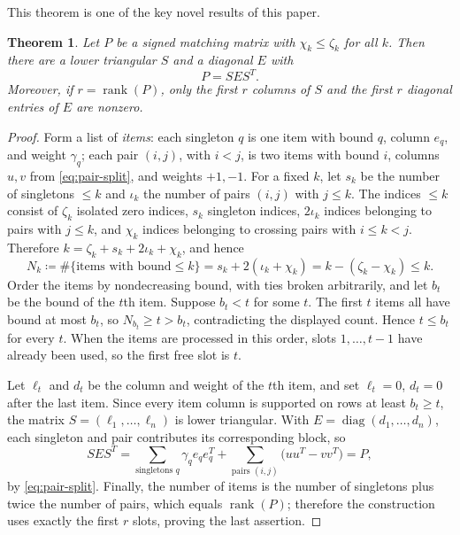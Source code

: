 \documentclass[preprint,12pt]{elsarticle}
\theoremstyle{plain}
\newtheorem{theorem}{Theorem}
\theoremstyle{nonumberplain}
\newtheorem{proof}{Proof}
\numberwithin{equation}{section}
\DeclareMathOperator{\rk}{rank}
\numberwithin{theorem}{section}
\begin{document}
This theorem is one of the key novel results of this paper.

\begin{theorem}\label{thm:ldlt-matching}
  Let $P$ be a signed matching matrix with $\chi_k \le \zeta_k$ for all $k$. Then there are a lower triangular $S$ and a diagonal $E$ with
  \[
    P = S E S^T .
  \]
  Moreover, if $r=\rk(P)$, only the first $r$ columns of $S$ and the first $r$ diagonal entries of $E$ are nonzero.
\end{theorem}

\begin{proof}
  Form a list of \emph{items}: each singleton $q$ is one item with bound $q$, column $e_q$, and weight $\gamma_q$; each pair $(i,j)$, with $i<j$, is two items with bound $i$, columns $u,v$ from \cref{eq:pair-split}, and weights $+1,-1$. For a fixed $k$, let $s_k$ be the number of singletons $\le k$ and $\iota_k$ the number of pairs $(i,j)$ with $j\le k$. The indices $\le k$ consist of $\zeta_k$ isolated zero indices, $s_k$ singleton indices, $2\iota_k$ indices belonging to pairs with $j\le k$, and $\chi_k$ indices belonging to crossing pairs with $i\le k<j$. Therefore $k=\zeta_k+s_k+2\iota_k+\chi_k$, and hence
  \[
    N_k\coloneq\#\{\text{items with bound}\le k\}
    = s_k + 2(\iota_k + \chi_k)
    = k - (\zeta_k - \chi_k)
    \le k .
  \]
  Order the items by nondecreasing bound, with ties broken arbitrarily, and let $b_t$ be the bound of the $t$th item. Suppose $b_t<t$ for some $t$. The first $t$ items all have bound at most $b_t$, so $N_{b_t}\ge t>b_t$, contradicting the displayed count. Hence $t\le b_t$ for every $t$. When the items are processed in this order, slots $1,\ldots,t-1$ have already been used, so the first free slot is $t$.

  Let $\ell_t$ and $d_t$ be the column and weight of the $t$th item, and set $\ell_t=0$, $d_t=0$ after the last item. Since every item column is supported on rows at least $b_t\ge t$, the matrix $S=(\ell_1,\ldots,\ell_n)$ is lower triangular. With $E=\operatorname{diag}(d_1,\ldots,d_n)$, each singleton and pair contributes its corresponding block, so
  \[
    S E S^T
    = \sum_{\text{singletons } q} \gamma_q e_q e_q^T
    + \sum_{\text{pairs } (i,j)} \bigl(uu^T-vv^T\bigr)
    = P ,
  \]
  by \cref{eq:pair-split}. Finally, the number of items is the number of singletons plus twice the number of pairs, which equals $\rk(P)$; therefore the construction uses exactly the first $r$ slots, proving the last assertion.
\end{proof}
\end{document}
